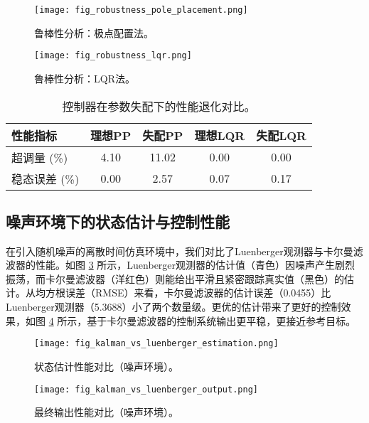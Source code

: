 \documentclass[12pt, a4paper]{article}
\begin{document}
\begin{figure}[htbp!]
    \centering
    \texttt{[image: fig\_robustness\_pole\_placement.png]}
    \caption{鲁棒性分析：极点配置法。}
    \label{fig:robustness_pp}
\end{figure}
\begin{figure}[htbp!]
    \centering
    \texttt{[image: fig\_robustness\_lqr.png]}
    \caption{鲁棒性分析：LQR法。}
    \label{fig:robustness_lqr}
\end{figure}

\begin{table}[htbp!]
    \centering
    \caption{控制器在参数失配下的性能退化对比。}
    \label{tab:performance2}
    \begin{tabular}{lcccc}
        \toprule
        \textbf{性能指标} & \textbf{理想PP} & \textbf{失配PP} & \textbf{理想LQR} & \textbf{失配LQR} \\
        \midrule
        超调量 (\%) & 4.10 & 11.02 & 0.00 & 0.00 \\
        稳态误差 (\%) & 0.00 & 2.57 & 0.07 & 0.17 \\
        \bottomrule
    \end{tabular}
\end{table}

\subsection{噪声环境下的状态估计与控制性能}
在引入随机噪声的离散时间仿真环境中，我们对比了Luenberger观测器与卡尔曼滤波器的性能。如图 \ref{fig:estimation_noise} 所示，Luenberger观测器的估计值（青色）因噪声产生剧烈振荡，而卡尔曼滤波器（洋红色）则能给出平滑且紧密跟踪真实值（黑色）的估计。从均方根误差（RMSE）来看，卡尔曼滤波器的估计误差（0.0455）比Luenberger观测器（5.3688）小了两个数量级。更优的估计带来了更好的控制效果，如图 \ref{fig:output_noise} 所示，基于卡尔曼滤波器的控制系统输出更平稳，更接近参考目标。

\begin{figure}[htbp!]
    \centering
    \texttt{[image: fig\_kalman\_vs\_luenberger\_estimation.png]}
    \caption{状态估计性能对比（噪声环境）。}
    \label{fig:estimation_noise}
\end{figure}
\begin{figure}[htbp!]
    \centering
    \texttt{[image: fig\_kalman\_vs\_luenberger\_output.png]}
    \caption{最终输出性能对比（噪声环境）。}
    \label{fig:output_noise}
\end{figure}
\end{document}
